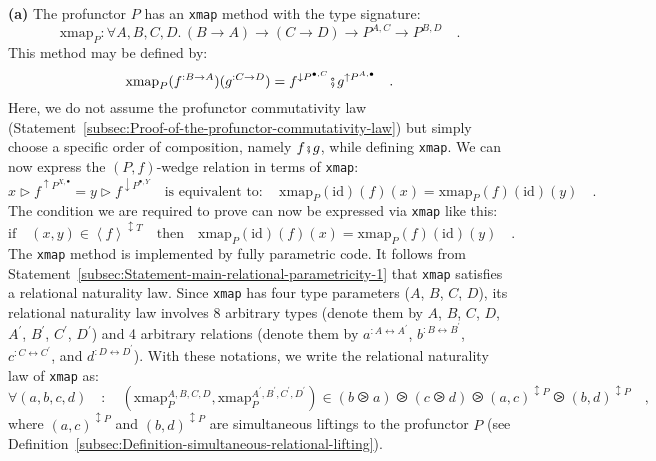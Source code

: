 \textbf{(a)} The profunctor $P$ has an \lstinline!xmap! method with
the type signature:
\[
\text{xmap}_{P}:\forall A,B,C,D.\,\left(B\rightarrow A\right)\rightarrow\left(C\rightarrow D\right)\rightarrow P^{A,C}\rightarrow P^{B,D}\quad.
\]
This method may be defined by:
\[
\text{xmap}_{P}(f^{:B\rightarrow A})(g^{:C\rightarrow D})=f^{\downarrow P^{\bullet,C}}\bef g^{\uparrow P^{A,\bullet}}\quad.
\]
Here, we do not assume the profunctor commutativity law (Statement~\ref{subsec:Proof-of-the-profunctor-commutativity-law})
but simply choose a specific order of composition, namely $f\bef g$,
while defining \lstinline!xmap!. We can now express the $\left(P,f\right)$-wedge
relation in terms of \lstinline!xmap!:
\[
x\triangleright f^{\uparrow P^{X,\bullet}}=y\triangleright f^{\downarrow P^{\bullet,Y}}\quad\text{is equivalent to}:\quad\text{xmap}_{P}(\text{id})(f)(x)=\text{xmap}_{P}(f)(\text{id})(y)\quad.
\]
The condition we are required to prove can now be expressed via \lstinline!xmap!
like this:
\begin{equation}
\text{if}\quad(x,y)\in\left<f\right>^{\updownarrow T}\quad\text{then}\quad\text{xmap}_{P}(\text{id})(f)(x)=\text{xmap}_{P}(f)(\text{id})(y)\quad.\label{eq:wedge-law-from-parametricity-derivation1}
\end{equation}
The \lstinline!xmap! method is implemented by fully parametric code.
It follows from Statement~\ref{subsec:Statement-main-relational-parametricity-1}
that \lstinline!xmap! satisfies a relational naturality law. Since
\lstinline!xmap! has four type parameters ($A$, $B$, $C$, $D$),
its relational naturality law involves 8 arbitrary types (denote them
by $A$, $B$, $C$, $D$, $A^{\prime}$, $B^{\prime}$, $C^{\prime}$,
$D^{\prime}$) and 4 arbitrary relations (denote them by $a^{:A\leftrightarrow A^{\prime}}$,
$b^{:B\leftrightarrow B^{\prime}}$, $c^{:C\leftrightarrow C^{\prime}}$,
and $d^{:D\leftrightarrow D^{\prime}}$). With these notations, we
write the relational naturality law of \lstinline!xmap! as:
\begin{equation}
\forall(a,b,c,d)\quad:\quad(\text{xmap}_{P}^{A,B,C,D},\text{xmap}_{P}^{A^{\prime},B^{\prime},C^{\prime},D^{\prime}})\in(b\ogreaterthan a)\ogreaterthan(c\ogreaterthan d)\ogreaterthan(a,c)^{\updownarrow P}\ogreaterthan(b,d)^{\updownarrow P}\quad,\label{eq:relational-naturality-law-of-xmap}
\end{equation}
where $(a,c)^{\updownarrow P}$ and $(b,d)^{\updownarrow P}$ are
simultaneous liftings to the profunctor $P$ (see Definition~\ref{subsec:Definition-simultaneous-relational-lifting}).
